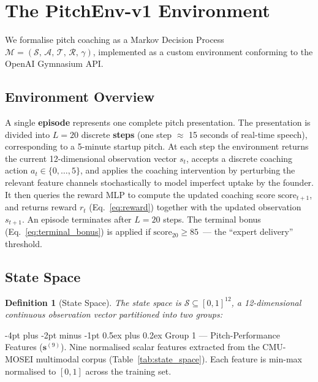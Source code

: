 \documentclass{article}
\makeatletter
\renewcommand\paragraph{\@startsection{paragraph}{4}{\z@}%
  {-4pt plus -2pt minus -1pt}%
  {0.5ex plus 0.2ex}%
  {\normalsize\bf}}
\newtheorem{definition}{Definition}
\makeatother
\begin{document}

\FloatBarrier
\section{The PitchEnv-v1 Environment}
\label{sec:env}

We formalise pitch coaching as a Markov Decision Process
$\mathcal{M} = (\mathcal{S},\, \mathcal{A},\, \mathcal{T},\, \mathcal{R},\, \gamma)$,
implemented as a custom environment conforming to the OpenAI Gymnasium API.

\FloatBarrier
\subsection{Environment Overview}

A single \textbf{episode} represents one complete pitch presentation.
The presentation is divided into $L = 20$ discrete \textbf{steps}
(one step $\approx$ 15 seconds of real-time speech), corresponding to
a 5-minute startup pitch.
At each step the environment returns the current 12-dimensional observation
vector $s_t$, accepts a discrete coaching action $a_t \in \{0,\ldots,5\}$,
and applies the coaching intervention by perturbing the relevant feature
channels stochastically to model imperfect uptake by the founder.
It then queries the reward MLP to compute the updated coaching score
$\text{score}_{t+1}$, and returns reward $r_t$ (Eq.~\ref{eq:reward}) together
with the updated observation $s_{t+1}$.
An episode terminates after $L = 20$ steps. The terminal bonus
(Eq.~\ref{eq:terminal_bonus}) is applied if
$\text{score}_{20} \geq 85$~--- the ``expert delivery'' threshold.

\FloatBarrier
\subsection{State Space}
\label{sec:states}

\begin{definition}[State Space]
The state space is $\mathcal{S} \subseteq [0,1]^{12}$, a 12-dimensional
continuous observation vector partitioned into two groups:
\end{definition}

\paragraph{Group 1 — Pitch-Performance Features ($\mathbf{s}^{(9)}$).}
Nine normalised scalar features extracted from the CMU-MOSEI multimodal
corpus (Table~\ref{tab:state_space}). Each feature is min-max normalised
to $[0, 1]$ across the training set.
\end{document}
